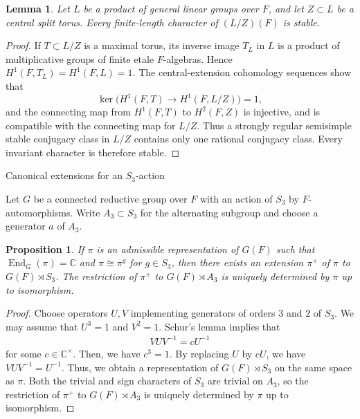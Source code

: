\documentclass[12pt]{amsart}
\makeatletter
\renewcommand{\subsection}{\@startsection{subsection}{2}%
  \z@{.7\linespacing\@plus.5\linespacing}{.35\linespacing}%
  {\normalfont\bfseries\raggedright}}
\theoremstyle{definition}
\theoremstyle{plain}
\newtheorem{proposition}[definition]{Proposition}
\newtheorem{lemma}[definition]{Lemma}
\theoremstyle{remark}
\DeclareMathOperator{\End}{End}%
\numberwithin{equation}{section}
\makeatother
\begin{document}
\begin{lemma}\label{lem:central-quotient-stability}
Let $L$ be a product of general linear groups over $F$, and let
$Z\subset L$ be a central split torus. Every finite-length character
of $(L/Z)(F)$ is stable.
\end{lemma}
\begin{proof}
If $T\subset L/Z$ is a maximal torus, its inverse image $T_L$ in $L$
is a product of multiplicative groups of finite etale $F$-algebras.
Hence $H^1(F,T_L)=H^1(F,L)=1$. 
The central-extension cohomology
sequences show that
\[
 \ker\bigl(H^1(F,T)\longrightarrow H^1(F,L/Z)\bigr)=1,
\]
and the connecting map from $H^1(F,T)$ to $H^2(F,Z)$ is injective,
and is compatible with the connecting map for $L/Z$.
Thus a strongly regular semisimple stable conjugacy class in $L/Z$ contains
only one rational conjugacy class. Every invariant character is
therefore stable.
\end{proof}

\subsection{Canonical extensions for an $S_3$-action}\label{subsec:canonical-extensions-s3-action}

Let $G$ be a connected reductive group over $F$ with an action of $S_3$ by $F$-automorphisms.
Write $A_3 \subset S_3$ for the alternating subgroup and choose a generator $a$ of $A_3$.


\begin{proposition}\label{prop:canonical}
      If $\pi$ is an admissible representation of $G(F)$ such that $\End_{G}(\pi)=\mathbb{C}$ and $\pi \cong \pi^g$ for $g \in S_3$, then there exists an extension $\pi^{+}$ of $\pi$ to $G(F) \rtimes S_3$.
      The restriction of $\pi^{+}$ to $G(F) \rtimes A_3$ is uniquely determined by $\pi$ up to isomorphism.
\end{proposition}

\begin{proof}
      Choose operators $U, V$ implementing generators of orders $3$ and $2$ of $S_3$. 
      We may assume that $U^3 = 1$ and $V^2 = 1$.
      Schur's lemma implies that 
      \begin{align*}
            VUV^{-1} = c U^{-1}
      \end{align*}
      for some $c \in \mathbb{C}^{\times}$.
      Then, we have $c^3 = 1$.
      By replacing $U$ by $cU$, we have $VUV^{-1} = U^{-1}$.
      Thus, we obtain a representation of $G(F) \rtimes S_3$ on the same space as $\pi$.
      Both the trivial and sign characters of $S_3$ are trivial on $A_3$, so the restriction of $\pi^{+}$ to $G(F) \rtimes A_3$ is uniquely determined by $\pi$ up to isomorphism.
\end{proof}
\end{document}
